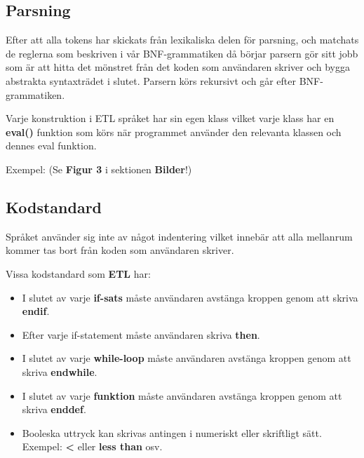 \documentclass{TDP019mall}
\begin{document}
\newpage
\subsection{Parsning}
Efter att alla tokens har skickats från lexikaliska delen för parsning, och matchats de reglerna som beskriven i vår 
BNF-grammatiken då börjar parsern gör sitt jobb som är att hitta det mönstret från det koden som användaren skriver och bygga abstrakta 
syntaxträdet i slutet. Parsern körs rekursivt och går efter BNF-grammatiken. 

Varje konstruktion i ETL språket har sin egen klass vilket varje klass har en \textbf{eval()} funktion som körs när programmet använder
 den relevanta klassen och dennes eval funktion. 
 
Exempel: (Se \textbf{Figur 3} i sektionen \textbf{Bilder}!)

\subsection{Kodstandard}
Språket använder sig inte av något indentering vilket innebär att alla mellanrum kommer tas bort från koden som användaren skriver. 

Vissa kodstandard som \textbf{ETL} har:
\begin{itemize}
\item I slutet av varje \textbf{if-sats} måste användaren avstänga kroppen genom att skriva \textbf{endif}.
\item Efter varje if-statement måste användaren skriva \textbf{then}.
\item I slutet av varje \textbf{while-loop} måste användaren avstänga kroppen genom att skriva \textbf{endwhile}.
\item I slutet av varje \textbf{funktion} måste användaren avstänga kroppen genom att skriva \textbf{enddef}.
\item Booleska uttryck kan skrivas antingen i numeriskt eller skriftligt sätt. Exempel: \textbf{<} eller \textbf{less than} osv.
\end{itemize}

\newpage
\end{document}
